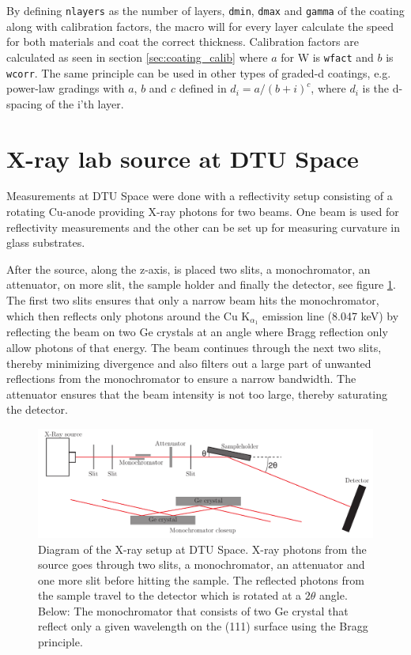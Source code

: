 By defining \verb|nlayers| as the number of layers, \verb|dmin|, \verb|dmax| and \verb|gamma| of the coating along with calibration factors, the macro will for every layer calculate the speed for both materials and coat the correct thickness. Calibration factors are calculated as seen in section \ref{sec:coating_calib} where $a$ for W is \verb|wfact| and $b$ is \verb|wcorr|. The same principle can be used in other types of graded-d coatings, e.g. power-law gradings with $a$, $b$ and $c$ defined in $d_i = a/(b+i)^c$, where $d_i$ is the d-spacing of the i'th layer.

\section{X-ray lab source at DTU Space}
Measurements at DTU Space were done with a reflectivity setup consisting of a rotating Cu-anode providing X-ray photons for two beams. One beam is used for reflectivity measurements and the other can be set up for measuring curvature in glass substrates.

After the source, along the z-axis, is placed two slits, a monochromator, an attenuator, on more slit, the sample holder and finally the detector, see figure \ref{fig:xraysetup}. The first two slits ensures that only a narrow beam hits the monochromator, which then reflects only photons around the Cu K$_{\alpha_1}$ emission line (8.047 keV) by reflecting the beam on two Ge crystals at an angle where Bragg reflection only allow photons of that energy. The beam continues through the next two slits, thereby minimizing divergence and also filters out a large part of unwanted reflections from the monochromator to ensure a narrow bandwidth. The attenuator ensures that the beam intensity is not too large, thereby saturating the detector.

\begin{figure}[!h]
  \center
  \includegraphics[width=0.8\linewidth]{figures/chamber/xraysetup.pdf}
\caption{\footnotesize Diagram of the X-ray setup at DTU Space. X-ray photons from the source goes through two slits, a monochromator, an attenuator and one more slit before hitting the sample. The reflected photons from the sample travel to the detector which is rotated at a $2\theta$ angle. Below: The monochromator that consists of two Ge crystal that reflect only a given wavelength on the (111) surface using the Bragg principle.}\label{fig:xraysetup}
\end{figure}

